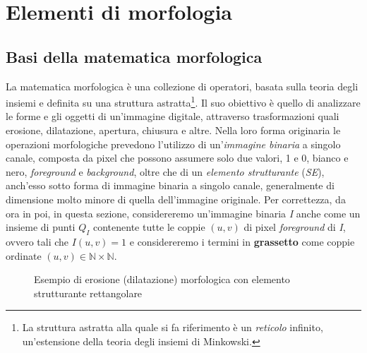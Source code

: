 \section{Elementi di morfologia}
\label{sec:math-morph}

\subsection{Basi della matematica morfologica}
\label{subsec:math-morph-basis}
La matematica morfologica \`e una collezione di operatori, basata sulla teoria degli insiemi e definita su una struttura astratta\footnote{La struttura astratta alla quale si fa riferimento \`e un \textit{reticolo} infinito, un'estensione della teoria degli insiemi di Minkowski.}. Il suo obiettivo \`e quello di analizzare le forme e gli oggetti di un'immagine digitale, attraverso trasformazioni quali erosione, dilatazione, apertura, chiusura e altre. Nella loro forma originaria le operazioni morfologiche prevedono l'utilizzo di un'\textit{immagine binaria} a singolo canale, composta da pixel che possono assumere solo due valori, 1 e 0, bianco e nero, \textit{foreground} e \textit{background}, oltre che di un \textit{elemento strutturante} (\textit{SE}), anch'esso sotto forma di immagine binaria a singolo canale, generalmente di dimensione molto minore di quella dell'immagine originale. Per correttezza, da ora in poi, in questa sezione, considereremo un'immagine binaria \textit{I} anche come un insieme di punti $Q_{I}$ contenente tutte le coppie $(u,v)$ di pixel \textit{foreground} di \textit{I}, ovvero tali che $I(u, v) = 1$ e considereremo i termini in \textbf{grassetto} come coppie ordinate $(u,v) \in \mathbb{N}\times\mathbb{N}$.
\begin{figure}[t]
	\centering
	\caption{Esempio di erosione (dilatazione) morfologica con elemento strutturante rettangolare} \label{fig:erosion-dilation}
\end{figure}
